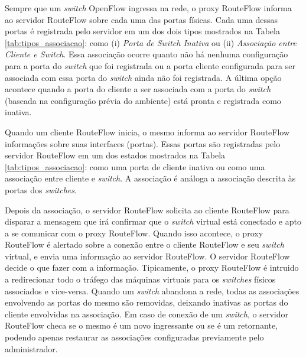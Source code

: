 Sempre que um \textit{switch} OpenFlow ingressa na rede, o proxy RouteFlow
informa ao servidor RouteFlow sobre cada uma das
portas físicas. Cada uma dessas portas é registrada pelo servidor
em um dos dois tipos mostrados na Tabela \ref{tab:tipos_associacao}:
como (i) \textit{Porta de Switch Inativa} ou (ii) \textit{Associação
entre Cliente e Switch}. Essa associação ocorre quanto 
não há nenhuma configuração para a porta do \textit{switch} que
foi registrada ou a porta cliente configurada para ser associada
com essa porta do \textit{switch} ainda não foi registrada. A última 
opção acontece quando a porta do cliente a ser associada com a
porta do \textit{switch} (baseada na configuração prévia do ambiente)
está pronta e registrada como inativa.

Quando um cliente RouteFlow inicia, o mesmo informa ao servidor RouteFlow 
informações sobre suas interfaces (portas). Essas portas são 
registradas pelo servidor RouteFlow em um dos estados mostrados na
Tabela \ref{tab:tipos_associacao}: como uma porta de cliente
inativa ou como uma associação entre cliente e \textit{switch}. A 
associação é análoga a associação descrita às portas dos
\textit{switches}.

Depois da associação, o servidor RouteFlow solicita ao cliente RouteFlow para
disparar a mensagem que irá confirmar que o \textit{switch} virtual está
conectado e apto a se comunicar com o proxy RouteFlow. Quando isso
acontece, o proxy RouteFlow é alertado sobre a conexão entre o 
cliente RouteFlow e seu \textit{switch} virtual, e envia uma informação ao 
servidor RouteFlow. O servidor RouteFlow decide o que fazer com a informação.
Tipicamente, o proxy RouteFlow é intruido a redirecionar todo o tráfego
das máquinas virtuais para os \textit{switches} físicos associados e 
vice-versa. Quando um \textit{switch} abandona a rede, todas as 
associações envolvendo as portas do mesmo são removidas,
deixando inativas as portas do cliente envolvidas na associação.
Em caso de conexão de um \textit{switch}, o servidor RouteFlow checa se o 
mesmo é um novo ingressante ou se é um retornante, podendo
apenas restaurar as associações configuradas previamente 
pelo administrador.



